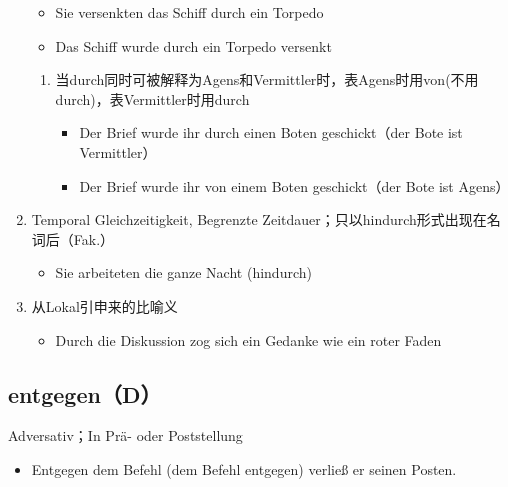 \documentclass[UTF8]{report}
\begin{document}
\begin{enumerate}
\begin{itemize}
        \item Sie versenkten das Schiff durch ein Torpedo
        \item Das Schiff wurde durch ein Torpedo versenkt
    \end{itemize}
    \begin{enumerate}
        \item 当durch同时可被解释为Agens和Vermittler时，表Agens时用von(不用durch)，表Vermittler时用durch
        \begin{itemize}
            \item Der Brief wurde ihr durch einen Boten geschickt（der Bote ist Vermittler）
            \item Der Brief wurde ihr von einem Boten geschickt（der Bote ist Agens）
        \end{itemize}
    \end{enumerate}
    \item Temporal Gleichzeitigkeit, Begrenzte Zeitdauer；只以hindurch形式出现在名词后（Fak.）
    \begin{itemize}
        \item Sie arbeiteten die ganze Nacht (hindurch)
    \end{itemize}
    \item 从Lokal引申来的比喻义
    \begin{itemize}
        \item Durch die Diskussion zog sich ein Gedanke wie ein roter Faden
    \end{itemize}
\end{enumerate}

\subsection{entgegen（D）}
Adversativ；In Prä- oder Poststellung
\begin{itemize}
    \item Entgegen dem Befehl (dem Befehl entgegen) verließ er seinen Posten.
\end{itemize}
\end{document}
